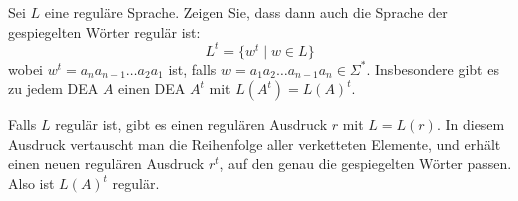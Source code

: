 Sei $L$ eine reguläre Sprache. Zeigen Sie, dass dann auch die Sprache
der gespiegelten Wörter regulär ist:
\[
L^t
=
\{
w^t\;|\;w\in L
\}
\]
wobei $w^t=a_na_{n-1}\dots a_2a_1$ ist, falls
$w=a_1a_2\dots a_{n-1}a_n\in\Sigma^*$. Insbesondere gibt es zu jedem DEA $A$
einen DEA $A^t$ mit $L(A^t)=L(A)^t$.


\begin{loesung}
Falls $L$ regulär ist, gibt es einen regulären Ausdruck $r$
mit $L=L(r)$. In diesem Ausdruck vertauscht man die Reihenfolge aller
verketteten Elemente, und erhält einen neuen regulären Ausdruck
$r^t$, auf den genau die gespiegelten Wörter passen.
Also ist $L(A)^t$ regulär.
\end{loesung}
